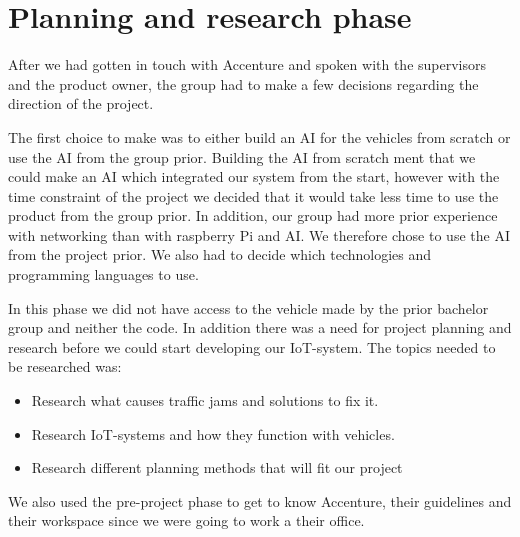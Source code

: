 \section{Planning and research phase}

After we had gotten in touch with Accenture and spoken with the supervisors and the product owner, the group had to make a few decisions regarding the direction of the project.

The first choice to make was to either build an AI for the vehicles from scratch or use the AI from the group prior. Building the AI from scratch ment that we could make an AI which integrated our system from the start, however with the time constraint of the project we decided that it would take less time to use the product from the group prior. In addition, our group had more prior experience with networking than with raspberry Pi and AI. We therefore chose to use the AI from the project prior. We also had to decide which technologies and programming languages to use.

In this phase we did not have access to the vehicle made by the prior bachelor group and neither the code. In addition there was a need for project planning and research before we could start developing our IoT-system. The topics needed to be researched was:

\begin{itemize}
\item Research what causes traffic jams and solutions to fix it.
\item Research IoT-systems and how they function with vehicles.
\item Research different planning methods that will fit our project
\end{itemize}
We also used the pre-project phase to get to know Accenture, their guidelines and their workspace since we were going to work a their office. 









